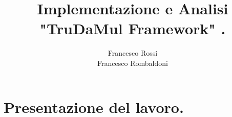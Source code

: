 \documentclass[13pt,a4paper]{article}
\title{ Implementazione  e Analisi "TruDaMul Framework" .}
\author{Francesco Rossi \\
				Francesco Rombaldoni}
\date{}
\begin{document}
	\maketitle
	\newpage
	
	\newpage
	
	\section{Presentazione del lavoro.}
	
	
\end{document}
